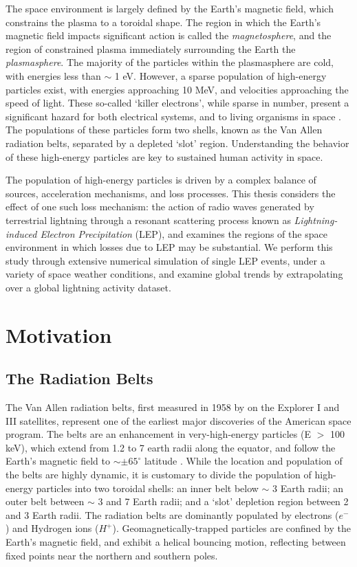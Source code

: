 The space environment is largely defined by the Earth's magnetic field, which constrains the plasma to a toroidal shape. The region in which the Earth's magnetic field impacts significant action is called the \emph{magnetosphere}, and the region of constrained plasma immediately surrounding the Earth the \emph{plasmasphere}. The majority of the particles within the plasmasphere are cold, with energies less than $\sim$ 1 eV. However, a sparse population of high-energy particles exist, with energies approaching 10 MeV, and velocities approaching the speed of light. These so-called `killer electrons', while sparse in number, present a significant hazard for both electrical systems, and to living organisms in space \citep{Barth2003}. The populations of these particles form two shells, known as the Van Allen radiation belts, separated by a depleted `slot' region. Understanding the behavior of these high-energy particles are key to sustained human activity in space. 

The population of high-energy particles is driven by a complex balance of sources, acceleration mechanisms, and loss processes. This thesis considers the effect of one such loss mechanism: the action of radio waves generated by terrestrial lightning through a resonant scattering process known as \emph{Lightning-induced Electron Precipitation} (LEP), and examines the regions of the space environment in which losses due to LEP may be substantial. We perform this study through extensive numerical simulation of single LEP events, under a variety of space weather conditions, and examine global trends by extrapolating over a global lightning activity dataset.



\section{Motivation}
\subsection{The Radiation Belts}
The Van Allen radiation belts, first measured in 1958 by \cite{VanAllen1958} on the Explorer I and III satellites, represent one of the earliest major discoveries of the American space program. The belts are an enhancement in very-high-energy particles (E $>$ 100 keV), which extend from 1.2 to 7 earth radii along the equator, and follow the Earth's magnetic field to $\sim \pm65^\circ$ latitude \citep{Walt1994}. While the location and population of the belts are highly dynamic, it is customary to divide the population of high-energy particles into two toroidal shells: an inner belt below $\sim$ 3 Earth radii; an outer belt between $\sim$ 3 and 7 Earth radii; and a `slot' depletion region between 2 and 3 Earth radii. The radiation belts are dominantly populated by electrons ($e^-$) and Hydrogen ions ($H^+$). Geomagnetically-trapped particles are confined by the Earth's magnetic field, and exhibit a helical bouncing motion, reflecting between fixed points near the northern and southern poles.

